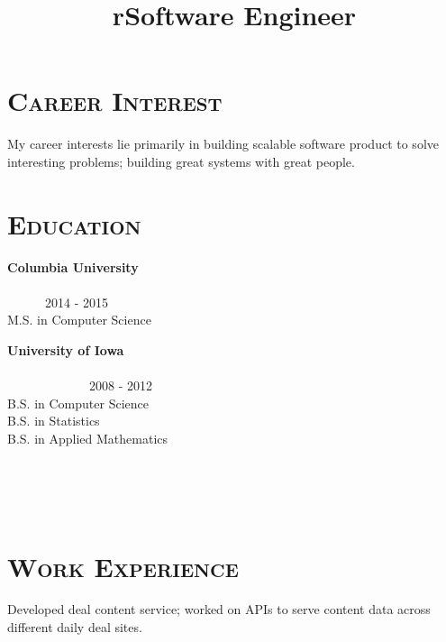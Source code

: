 \begin{resume}


\section{\textsc{Career Interest}}
My career interests lie primarily in building scalable software product to solve interesting problems; building great systems with great people. 
\section{\textsc{Education}}

\textbf{Columbia University} \ \ \ \ \ \ \ \ \ \ \ \ \ \ \ \ \ \ \ \ \ \ \ \ \ \ \ \ \ \ \ \ \ \ \ \ \ \ \ \ \ \ \ \ \ \ \ \ \ \ \ \ \ \ \ \ \ \ \ \ \ \ \ \ \ \ \ \ \ \ \ \ \ \ \ \ \ \ 2014 - 2015 \\
M.S. in Computer Science

\textbf{University of Iowa} \ \ \ \ \ \ \ \ \ \ \ \ \ \ \ \ \ \ \ \ \ \ \ \ \ \ \ \ \ \ \ \ \ \ \ \ \ \ \ \ \ \ \ \ \ \ \ \ \ \  \ \ \ \ \ \ \ \ \ \ \ \ \ \ \ \ \ \ \ \ \ \ \ \ \ \ \ \ \ \ \ \ \ \ \  2008 - 2012 \\ 
B.S. in Computer Science  \\
B.S. in Statistics \\
B.S. in Applied Mathematics


\begin{formatb}
  \title{r}\\
  \\
  \body\\
\end{formatb}

\section{\textsc{Work Experience}}

\title{Software Engineer}
\begin{position}	
Developed deal content service; worked on APIs to serve content data across different daily deal sites.
\end{position}


\end{resume}
